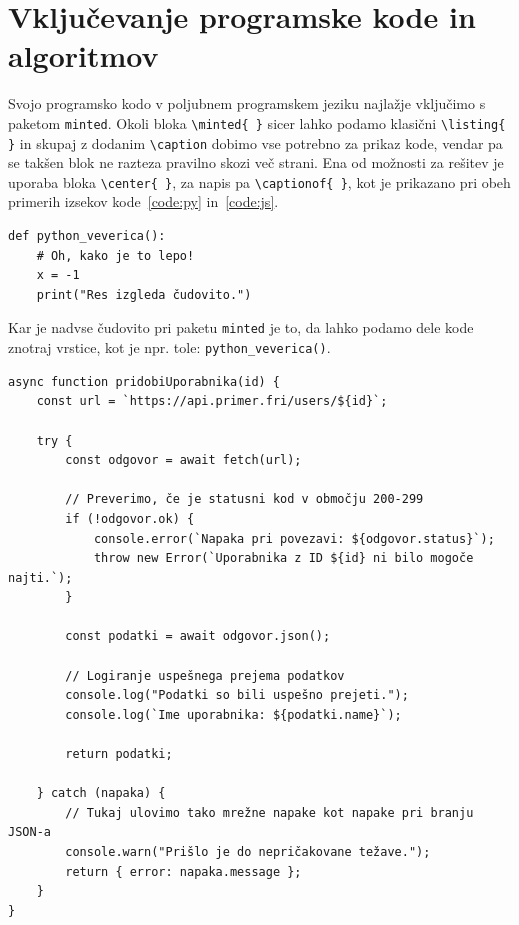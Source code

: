 \documentclass[a4paper,12pt,openright]{book}
\begin{document}
\chapter{Vključevanje programske kode in algoritmov}
\label{ch:koda}

Svojo programsko kodo v poljubnem programskem jeziku najlažje vključimo s paketom \texttt{minted}. Okoli bloka \texttt{\textbackslash minted\{ \}} sicer lahko podamo klasični \texttt{\textbackslash listing\{ \}} in skupaj z dodanim \texttt{\textbackslash caption} dobimo vse potrebno za prikaz kode, vendar pa se takšen blok ne razteza pravilno skozi več strani. Ena od možnosti za rešitev je uporaba bloka \texttt{\textbackslash center\{ \}}, za napis pa \texttt{\textbackslash captionof\{ \}}, kot je prikazano pri obeh primerih izsekov kode~\ref{code:py} in~\ref{code:js}.

\begin{center}

\begin{verbatim}
def python_veverica():
    # Oh, kako je to lepo!
    x = -1
    print("Res izgleda čudovito.")
\end{verbatim}

\label{code:py}
\end{center}

Kar je nadvse čudovito pri paketu \texttt{minted} je to, da lahko podamo dele kode znotraj vrstice, kot je npr. tole: \texttt{python_veverica()}.

\begin{center}

\begin{verbatim}
async function pridobiUporabnika(id) {
    const url = `https://api.primer.fri/users/${id}`;
    
    try {
        const odgovor = await fetch(url);
        
        // Preverimo, če je statusni kod v območju 200-299
        if (!odgovor.ok) {
            console.error(`Napaka pri povezavi: ${odgovor.status}`);
            throw new Error(`Uporabnika z ID ${id} ni bilo mogoče najti.`);
        }

        const podatki = await odgovor.json();
        
        // Logiranje uspešnega prejema podatkov
        console.log("Podatki so bili uspešno prejeti.");
        console.log(`Ime uporabnika: ${podatki.name}`);
        
        return podatki;
        
    } catch (napaka) {
        // Tukaj ulovimo tako mrežne napake kot napake pri branju JSON-a
        console.warn("Prišlo je do nepričakovane težave.");
        return { error: napaka.message };
    }
}
\end{verbatim}
\label{code:js}
\end{center}
\end{document}
